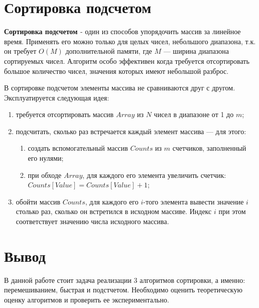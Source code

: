 \section{Сортировка подсчетом}

\textbf{Сортировка подсчетом \cite{select}} - один из способов упорядочить массив за линейное время. Применять его можно только для целых чисел, небольшого диапазона, т.к. он требует $O(M)$ дополнительной памяти, где $M$ — ширина диапазона сортируемых чисел. Алгоритм особо эффективен когда требуется отсортировать большое количество чисел, значения которых имеют небольшой разброс.

В сортировке подсчетом элементы массива не сравниваются друг с другом. Эксплуатируется следующая идея:

\begin{enumerate}
	\item требуется отсортировать массив $Array$ из $N$ чисел в диапазоне от 1 до $m$;
	\item подсчитать, сколько раз встречается каждый элемент массива — для этого:
	\begin{enumerate}
		\item создать вспомогательный массив $Counts$ из $m$ счетчиков, заполненный его нулями;
		\item при обходе $Array$, для каждого его элемента увеличить счетчик: $Counts[Value] = Counts[Value] + 1$;
	\end{enumerate}
	\item обойти массив $Counts$, для каждого его $i$-того элемента вывести значение $i$ столько раз, сколько он встретился в исходном массиве. Индекс $i$ при этом соответствует значению числа исходного массива.
\end{enumerate}

\section*{Вывод}

В данной работе стоит задача реализации 3 алгоритмов сортировки, а
именно: перемешиванием, быстрая и подстчетом. Необходимо оценить теоретическую оценку алгоритмов и проверить ее экспериментально.



